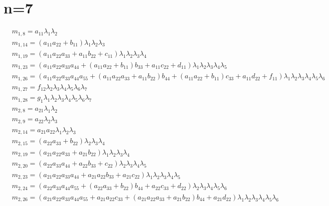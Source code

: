 \documentclass{article}
\begin{document}
\section{n=7}
\begin{align*}
&m_{1,8}=a_{11} \lambda_{1} \lambda_{2}\\
&m_{1,14}={\left(a_{11} a_{22} + b_{11}\right)} \lambda_{1} \lambda_{2} \lambda_{3}\\
&m_{1,19}={\left(a_{11} a_{22} a_{33} + a_{11} b_{22} + c_{11}\right)} \lambda_{1} \lambda_{2} \lambda_{3} \lambda_{4}\\
&m_{1,23}={\left(a_{11} a_{22} a_{33} a_{44} + {\left(a_{11} a_{22} + b_{11}\right)} b_{33} + a_{11} c_{22} + d_{11}\right)} \lambda_{1} \lambda_{2} \lambda_{3} \lambda_{4} \lambda_{5}\\
&m_{1,26}={\left(a_{11} a_{22} a_{33} a_{44} a_{55} + {\left(a_{11} a_{22} a_{33} + a_{11} b_{22}\right)} b_{44} + {\left(a_{11} a_{22} + b_{11}\right)} c_{33} + a_{11} d_{22} + f_{11}\right)} \lambda_{1} \lambda_{2} \lambda_{3} \lambda_{4} \lambda_{5} \lambda_{6}\\
&m_{1,27}=f_{12} \lambda_{2} \lambda_{3} \lambda_{4} \lambda_{5} \lambda_{6} \lambda_{7}\\
&m_{1,28}=g_{1} \lambda_{1} \lambda_{2} \lambda_{3} \lambda_{4} \lambda_{5} \lambda_{6} \lambda_{7}\\
&m_{2,8}=a_{21} \lambda_{1} \lambda_{2}\\
&m_{2,9}=a_{22} \lambda_{2} \lambda_{3}\\
&m_{2,14}=a_{21} a_{22} \lambda_{1} \lambda_{2} \lambda_{3}\\
&m_{2,15}={\left(a_{22} a_{33} + b_{22}\right)} \lambda_{2} \lambda_{3} \lambda_{4}\\
&m_{2,19}={\left(a_{21} a_{22} a_{33} + a_{21} b_{22}\right)} \lambda_{1} \lambda_{2} \lambda_{3} \lambda_{4}\\
&m_{2,20}={\left(a_{22} a_{33} a_{44} + a_{22} b_{33} + c_{22}\right)} \lambda_{2} \lambda_{3} \lambda_{4} \lambda_{5}\\
&m_{2,23}={\left(a_{21} a_{22} a_{33} a_{44} + a_{21} a_{22} b_{33} + a_{21} c_{22}\right)} \lambda_{1} \lambda_{2} \lambda_{3} \lambda_{4} \lambda_{5}\\
&m_{2,24}={\left(a_{22} a_{33} a_{44} a_{55} + {\left(a_{22} a_{33} + b_{22}\right)} b_{44} + a_{22} c_{33} + d_{22}\right)} \lambda_{2} \lambda_{3} \lambda_{4} \lambda_{5} \lambda_{6}\\
&m_{2,26}={\left(a_{21} a_{22} a_{33} a_{44} a_{55} + a_{21} a_{22} c_{33} + {\left(a_{21} a_{22} a_{33} + a_{21} b_{22}\right)} b_{44} + a_{21} d_{22}\right)} \lambda_{1} \lambda_{2} \lambda_{3} \lambda_{4} \lambda_{5} \lambda_{6}\\

\end{align*}
\end{document}
